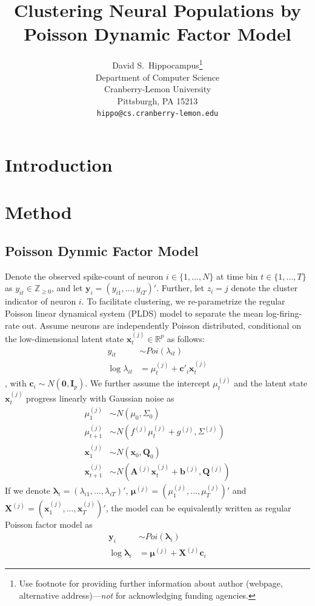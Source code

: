 \documentclass{article}
\title{Clustering Neural Populations by Poisson Dynamic Factor Model}
\author{%
	David S.~Hippocampus\thanks{Use footnote for providing further information
		about author (webpage, alternative address)---\emph{not} for acknowledging
		funding agencies.} \\
	Department of Computer Science\\
	Cranberry-Lemon University\\
	Pittsburgh, PA 15213 \\
	\texttt{hippo@cs.cranberry-lemon.edu} \\
}
\begin{document}
	
	\maketitle
	
	\begin{abstract}
		\answerTODO{}
	\end{abstract}
	
	\section{Introduction}
	\label{intro}
	\answerTODO{}
	
	\section{Method}
	\label{method}
	
	\subsection{Poisson Dynmic Factor Model}
	Denote the observed spike-count of neuron $i \in \{ 1,\ldots,N\}$ at
	time bin $t \in \{ 1,\ldots,T\}$ as
	$y_{it} \in \mathbb{Z}_{\geq 0}$, and let
	$\bm{y}_{i} =  (y_{i1},\ldots,y_{iT})'$.
	Further, let $z_{i} = j$ denote the cluster indicator of neuron $i$. To facilitate clustering, we re-parametrize the regular Poisson linear dynamical system (PLDS) model to separate the mean log-firing-rate out. Assume neurons are independently Poisson distributed, conditional on the
	low-dimensional latent state $\bm{x}_{t}^{(j)} \in \mathbb{R}^{p}$ as follows:
	\begin{align*}
		y_{it} &\sim Poi(\lambda_{it})\\
		\log\lambda_{it} &= \mu_t^{(j)} + \bm{c}'_i\bm{x}^{(j)}_t
	\end{align*}
	, with $\bm{c}_i\sim N(\bm{0},\bm{I}_p)$. We further assume the intercept $\mu_t^{(j)}$ and the latent state $\bm{x}^{(j)}_t$ progress linearly with Gaussian noise as
	\begin{align*}
		\mu_1^{(j)} &\sim N(\mu_0, \Sigma_0)\\
		\mu_{t+1}^{(j)} &\sim N(f^{(j)}\mu_t^{(j)} + g^{(j)}, \Sigma^{(j)})\\
		\bm{x}_1^{(j)} &\sim N(\bm{x}_0, \bm{Q}_0)\\
		\bm{x}_{t+1}^{(j)} &\sim N(\bm{A}^{(j)}\bm{x}_t^{(j)} + \bm{b}^{(j)}, \bm{Q}^{(j)})
	\end{align*}
	If we denote $\bm{\lambda}_{i} =  (\lambda_{i1},\ldots,\lambda_{iT})'$, $\bm{\mu}^{(j)} = (\mu^{(j)}_1,\ldots,\mu^{(j)}_T)'$ and $\bm{X}^{(j)} = (\bm{x}^{(j)}_1,\ldots,\bm{x}^{(j)}_T)'$, the model can be equivalently written as regular Poisson factor model as
	\begin{align*}
		\bm{y}_i &\sim Poi(\bm{\lambda}_i)\\
		\log\bm{\lambda}_i &= \bm{\mu}^{(j)}+ \bm{X}^{(j)}\bm{c}_i 
	\end{align*}
\end{document}

